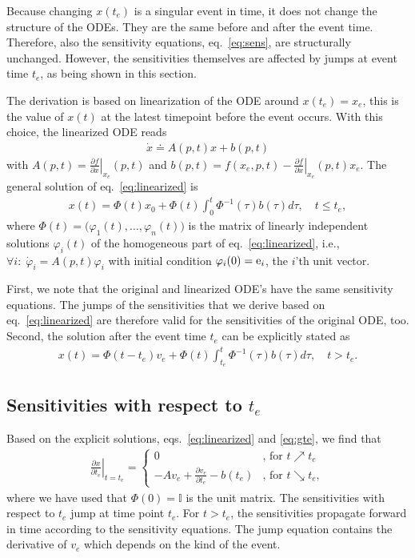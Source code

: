 \documentclass[journal, a4paper]{IEEEtran}
\begin{document}
Because changing $x(t_e)$ is a singular event in time, it does not change the structure of the ODEs. They are the same before and after the event time. Therefore, also the sensitivity equations, eq.~\eqref{eq:sens}, are structurally unchanged. However, the sensitivities themselves are affected by jumps at event time $t_e$, as being shown in this section.

The derivation is based on linearization of the ODE around $x(t_e) = x_e$, this is the value of $x(t)$ at the latest timepoint before the event occurs. With this choice, the linearized ODE reads
\begin{align}
    \dot x \doteq A(p, t) x + b(p, t)
    \label{eq:linearized}
\end{align}
with $A(p, t) = \left.\frac{\partial f}{\partial x}\right|_{x_e}(p, t)$ and $b(p, t) = f(x_e, p, t)- \left.\frac{\partial f}{\partial x}\right|_{x_e}(p, t)x_e$. The general solution of eq.~\eqref{eq:linearized} is
\begin{align}
    x(t) = \Phi(t)x_0 + \Phi(t)\int_0^t \Phi^{-1}(\tau)b(\tau)d\tau,\quad t\leq t_e,
    \label{eq:leqte}
\end{align}
where $\Phi(t) = \big(\varphi_1(t), \dots, \varphi_n(t)\big)$ is the matrix of linearly independent solutions $\varphi_i(t)$ of the homogeneous part of eq.~\eqref{eq:linearized}, i.e., $\forall i:\;\dot\varphi_i = A(p, t)\varphi_i$ with initial condition $\varphi_i(0) = {\rm e}_i$, the $i$'th unit vector. 

First, we note that the original and linearized ODE's have the same sensitivity equations. The jumps of the sensitivities that we derive based on eq.~\eqref{eq:linearized} are therefore valid for the sensitivities of the original ODE, too. Second, the solution after the event time $t_e$ can be explicitly stated as
\begin{align}
    x(t) = \Phi(t-t_e)v_e + \Phi(t)\int_{t_e}^{t}\Phi^{-1}(\tau)b(\tau)d\tau,\quad t > t_e.
    \label{eq:gte}
\end{align}

\subsection{Sensitivities with respect to $t_e$}
Based on the explicit solutions, eqs.~\eqref{eq:linearized} and \eqref{eq:gte}, we find that
\begin{align}
    \left.\frac{\partial x}{\partial t_e}\right|_{t = t_e} =
    \left\{
    \begin{array}{ll}
    0     & \textrm{, for } t\nearrow t_e \\
    -A v_e + \frac{\partial v_e}{\partial t_e} - b(t_e)     & \textrm{, for }t \searrow t_e, 
    \end{array}
    \right.
    \label{eq:jump}
\end{align}
where we have used that $\Phi(0) = \mathbb I$ is the unit matrix. The sensitivities with respect to $t_e$ jump at time point $t_e$. For $t > t_e$, the sensitivities propagate forward in time according to the sensitivity equations. The jump equation contains the derivative of $v_e$ which depends on the kind of the event.\\
\end{document}
